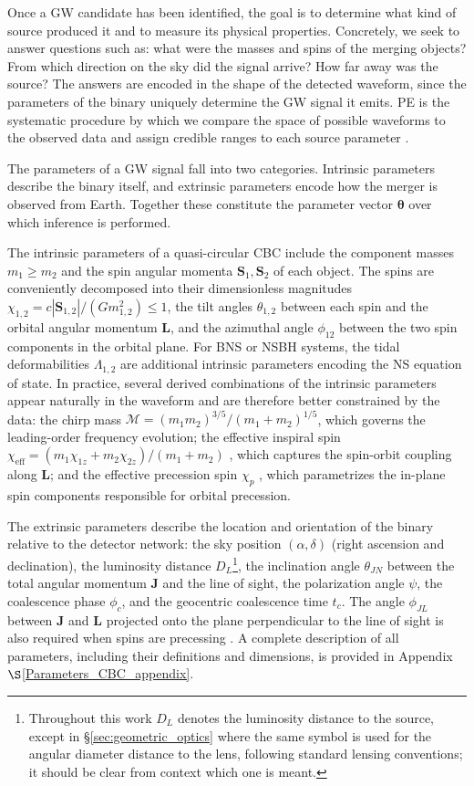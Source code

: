 Once a GW candidate has been identified, the goal is to determine what kind of source produced it and to measure its physical properties. Concretely, we seek to answer questions such as: what were the masses and spins of the merging objects? From which direction on the sky did the signal arrive? How far away was the source? The answers are encoded in the shape of the detected waveform, since the parameters of the binary uniquely determine the GW signal it emits. PE is the systematic procedure by which we compare the space of possible waveforms to the observed data and assign credible ranges to each source parameter \cite{bayesfactor_8}.

The parameters of a GW signal fall into two categories. Intrinsic parameters describe the binary itself, and extrinsic parameters encode how the merger is observed from Earth. Together these constitute the parameter vector 
$\boldsymbol{\theta}$ over which inference is performed.

The intrinsic parameters of a quasi-circular CBC include the 
component masses $m_1 \geq m_2$ and the spin angular momenta 
$\mathbf{S}_1, \mathbf{S}_2$ of each object. The spins are 
conveniently decomposed into their dimensionless magnitudes 
$\chi_{1,2} = c|\mathbf{S}_{1,2}|/(Gm_{1,2}^2) \leq 1$, the tilt angles $\theta_{1,2}$ between each spin and the orbital angular momentum $\mathbf{L}$, and the azimuthal angle $\phi_{12}$ between the two spin components in the orbital plane. For BNS or NSBH systems, the tidal deformabilities $\Lambda_{1,2}$ are additional intrinsic parameters encoding the NS equation of state. In practice, several derived combinations of the intrinsic parameters appear naturally in the waveform and are therefore better constrained by the data: the chirp mass $\mathcal{M} = (m_1 m_2)^{3/5}/(m_1+m_2)^{1/5}$, which governs the leading-order frequency evolution; the effective inspiral spin $\chi_\mathrm{eff} = (m_1\chi_{1z} + m_2\chi_{2z})/(m_1+m_2)$ \cite{effective_inspiral_spin}, which captures the spin-orbit coupling along $\mathbf{L}$; and the effective precession spin $\chi_p$ \cite{effective_precession_spin}, which parametrizes the in-plane spin components responsible for orbital precession.

The extrinsic parameters describe the location and orientation of the binary relative to the detector network: the sky position $(\alpha, \delta)$ (right ascension and declination), the luminosity distance $D_L$\footnote{Throughout this work $D_L$ denotes the luminosity distance to the source, except in \S\ref{sec:geometric_optics} where the same symbol is used for the angular diameter distance to the lens, following standard lensing conventions; it should be clear from context which one is meant.}, the inclination angle $\theta_{JN}$ between the total angular momentum $\mathbf{J}$ and the line of sight, the polarization angle $\psi$, the coalescence phase $\phi_c$, and the
geocentric coalescence time $t_c$. The angle $\phi_{JL}$ between $\mathbf{J}$ and $\mathbf{L}$ projected onto the plane perpendicular to the line of sight is also required when spins are precessing \cite{likelihood_formula}. A complete description of all parameters, including their definitions and dimensions, is provided in Appendix~$\S$\ref{Parameters_CBC_appendix}.

